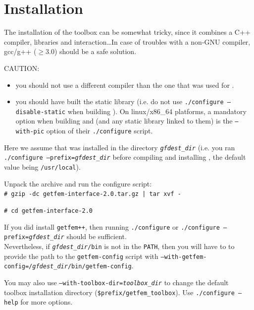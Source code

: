 \vfill
\begin{quote}

\end{quote}
\newpage
\tableofcontents
\newpage

\section{Installation}
The installation of the \gfi toolbox can be somewhat tricky, since it
combines a C++ compiler, libraries and \Mlab interaction\ldots In
case of troubles with a non-GNU compiler, gcc/g++ ($\geq3.0$) should be a
safe solution.

CAUTION: 
\begin{itemize}
  \item you should not use a different compiler than the one that was used for \gf.
  \item you should have built the \gf static library (i.e. do not use \texttt{./configure --disable-static} when building \gf). On linux/x86\_64 platforms, a mandatory option when building \gf and \gfi (and any static library linked to them) is the \texttt{--with-pic} option of their \texttt{./configure} script. 
\end{itemize}

Here we assume that \gf was installed in the directory
\texttt{\textit{gfdest_dir}} (i.e.  you ran \texttt{./configure --prefix=\textit{gfdest_dir}}
before compiling and installing \gf, the default value being
\texttt{/usr/local}).

Unpack the \gfi archive and run the configure script:\\[2mm]

\verb+# gzip -dc getfem-interface-2.0.tar.gz | tar xvf -+

\verb+# cd getfem-interface-2.0+

If you did install \texttt{getfem++}, then running 
\texttt{./configure} or \texttt{./configure --prefix=\textit{gfdest_dir}}
should be sufficient.\\

Nevertheless, if \texttt{\textit{gfdest_dir}/bin} is not in the \texttt{PATH}, then you will 
have to to provide the path to the \texttt{getfem-config} script
with \texttt{--with-getfem-config=/\textit{gfdest_dir}/bin/getfem-config}.

You may also use \texttt{--with-toolbox-dir=\textit{toolbox_dir}} to
change the default toolbox installation directory (\texttt{\$prefix/getfem_toolbox}).
Use \texttt{./configure --help} for more options.\\[2mm]

